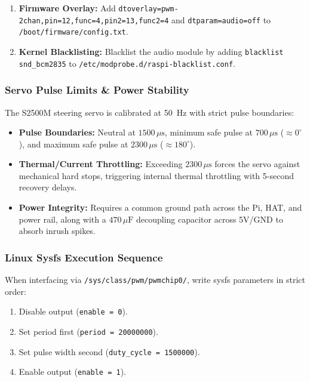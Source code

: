 \documentclass[12pt,a4paper]{article}
\begin{document}
\begin{enumerate}
    \item \textbf{Firmware Overlay:} Add \texttt{dtoverlay=pwm-2chan,pin=12,func=4,pin2=13,func2=4} and \texttt{dtparam=audio=off} to \texttt{/boot/firmware/config.txt}.
    \item \textbf{Kernel Blacklisting:} Blacklist the audio module by adding \texttt{blacklist snd\_bcm2835} to \texttt{/etc/modprobe.d/raspi-blacklist.conf}.
\end{enumerate}

\subsubsection*{Servo Pulse Limits \& Power Stability}
The S2500M steering servo is calibrated at 50~Hz with strict pulse boundaries:
\begin{itemize}
    \item \textbf{Pulse Boundaries:} Neutral at $1500\,\mu\text{s}$, minimum safe pulse at $700\,\mu\text{s}$ ($\approx 0^\circ$), and maximum safe pulse at $2300\,\mu\text{s}$ ($\approx 180^\circ$).
    \item \textbf{Thermal/Current Throttling:} Exceeding $2300\,\mu\text{s}$ forces the servo against mechanical hard stops, triggering internal thermal throttling with 5-second recovery delays.
    \item \textbf{Power Integrity:} Requires a common ground path across the Pi, HAT, and power rail, along with a $470\,\mu\text{F}$ decoupling capacitor across 5V/GND to absorb inrush spikes.
\end{itemize}

\subsubsection*{Linux Sysfs Execution Sequence}
When interfacing via \texttt{/sys/class/pwm/pwmchip0/}, write sysfs parameters in strict order:
\begin{enumerate}
    \item Disable output (\texttt{enable = 0}).
    \item Set period first (\texttt{period = 20000000}).
    \item Set pulse width second (\texttt{duty\_cycle = 1500000}).
    \item Enable output (\texttt{enable = 1}).
\end{enumerate}

\pagebreak
\end{document}
